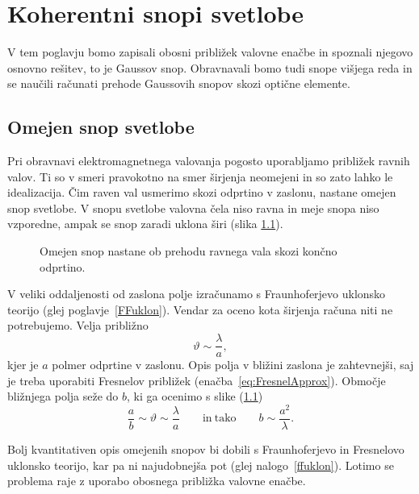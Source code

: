 
\chapter{Koherentni snopi svetlobe}
V tem poglavju bomo zapisali obosni približek valovne enačbe in spoznali 
njegovo osnovno rešitev, to je Gaussov snop. Obravnavali bomo tudi snope višjega reda in
se naučili računati prehode Gaussovih snopov skozi optične elemente. 

\section{Omejen snop svetlobe}
Pri obravnavi elektromagnetnega valovanja pogosto uporabljamo
približek ravnih valov. Ti so v smeri pravokotno na smer širjenja
neomejeni in so zato lahko le idealizacija. Čim raven val usmerimo skozi odprtino
v zaslonu, nastane omejen snop svetlobe. V snopu svetlobe valovna čela niso
ravna in meje snopa niso vzporedne, ampak se snop zaradi uklona širi 
(slika \ref{fig:Uklon-na-rezi}).
\begin{figure}[h]
\centering
\def\svgwidth{120truemm} 

\caption{Omejen snop nastane ob prehodu ravnega vala skozi končno odprtino.}
\label{fig:Uklon-na-rezi}
\end{figure}

V veliki oddaljenosti od zaslona polje izračunamo s
Fraunhoferjevo uklonsko teorijo (glej poglavje~\ref{FFuklon}). 
Vendar za oceno kota širjenja računa niti ne potrebujemo. Velja približno 
\begin{equation}
\vartheta\sim\frac{\lambda}{a},
\label{eq:kot_ocena}
\end{equation}
kjer je $a$ polmer odprtine v zaslonu.
Opis polja v bližini zaslona je zahtevnejši, saj je treba uporabiti 
Fresnelov približek (enačba~\ref{eq:FresnelApprox}).
Območje bližnjega polja seže do $b$, ki ga ocenimo s slike (\ref{fig:Uklon-na-rezi})
\begin{equation}
\frac{a}{b}\sim{\vartheta}\sim \frac{\lambda}{a} \qquad \mathrm{in~tako} \qquad b\sim\frac{a^2}{\lambda}.
\label{eq:z_ocena}
\end{equation}

Bolj kvantitativen opis omejenih
snopov bi dobili s Fraunhoferjevo in Fresnelovo uklonsko teorijo,
kar pa ni najudobnejša pot (glej nalogo~\ref{ffuklon}). Lotimo se problema raje z 
uporabo obosnega približka valovne enačbe.

